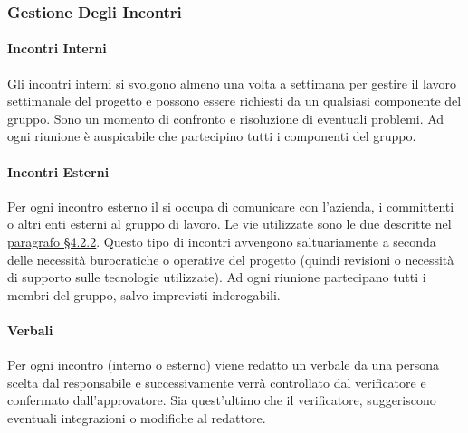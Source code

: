 \subsubsection{Gestione Degli Incontri}
	\paragraph{Incontri Interni}
	Gli incontri interni si svolgono almeno una volta a settimana per gestire il lavoro settimanale del progetto e possono essere richiesti da un qualsiasi componente del gruppo. Sono un momento di confronto e risoluzione di eventuali problemi. Ad ogni riunione è auspicabile che partecipino tutti i componenti del gruppo.
	\paragraph{Incontri Esterni}
	Per ogni incontro esterno il \RdP{} si occupa di comunicare con l'azienda, i committenti o altri enti esterni al gruppo di lavoro. 
	Le vie utilizzate sono le due descritte nel \hyperref[sec:Comunicazioni Esterne]{paragrafo \S4.2.2}.
	Questo tipo di incontri avvengono saltuariamente a seconda delle necessità burocratiche o operative del progetto (quindi revisioni o necessità di supporto sulle tecnologie utilizzate).
	Ad ogni riunione partecipano tutti i membri del gruppo, salvo imprevisti inderogabili.
	\paragraph{Verbali}
	Per ogni incontro (interno o esterno) viene redatto un verbale da una persona scelta dal responsabile e successivamente verrà controllato dal verificatore e confermato dall’approvatore. Sia quest'ultimo che il verificatore, suggeriscono eventuali integrazioni o modifiche al redattore.

